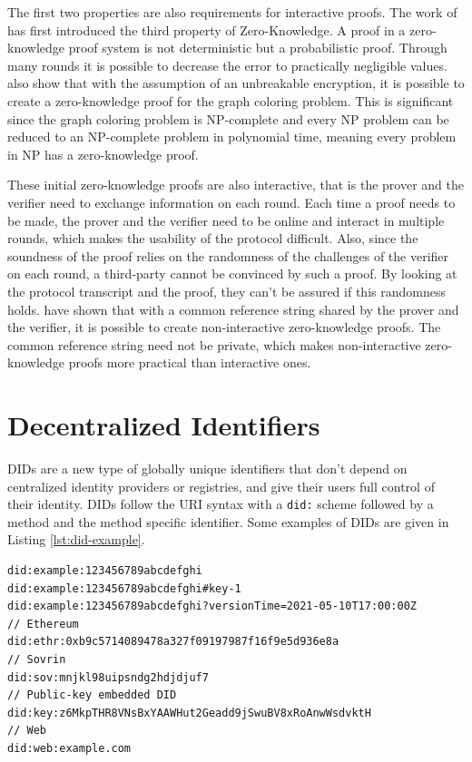 The first two properties are also requirements for interactive proofs. The work of \cite{Goldwasser.1985} has first introduced the third property of Zero-Knowledge. A proof in a zero-knowledge proof system is not deterministic but a probabilistic proof. Through many rounds it is possible to decrease the error to practically negligible values. \cite{Goldreich.1991} also show that with the assumption of an unbreakable encryption, it is possible to create a zero-knowledge proof for the graph coloring problem. This is significant since the graph coloring problem is NP-complete and every NP problem can be reduced to an NP-complete problem in polynomial time, meaning every problem in NP has a zero-knowledge proof. 

These initial zero-knowledge proofs are also interactive, that is the prover and the verifier need to exchange information on each round. Each time a proof needs to be made, the prover and the verifier need to be online and interact in multiple rounds, which makes the usability of the protocol difficult. Also, since the soundness of the proof relies on the randomness of the challenges of the verifier on each round, a third-party cannot be convinced by such a proof. By looking at the protocol transcript and the proof, they can't be assured if this randomness holds. \cite{Blum.1988} have shown that with a common reference string shared by the prover and the verifier, it is possible to create non-interactive zero-knowledge proofs. The common reference string need not be private, which makes non-interactive zero-knowledge proofs more practical than interactive ones.


\section{Decentralized Identifiers}

\acrfull{DID}s \parencite{reed_sporny_longley_allen_grant_sabadello_2021} are a new type of globally unique identifiers that don't depend on centralized identity providers or registries, and give their users full control of their identity. \acrshort{DID}s follow the \acrshort{URI} syntax with a \lstinline{did:} scheme followed by a method and the method specific identifier. Some examples of \acrshort{DID}s are given in Listing \ref{lst:did-example}.

\begin{lstlisting}[label={lst:did-example}, caption={\acrlong{DID} examples}]
did:example:123456789abcdefghi
did:example:123456789abcdefghi#key-1
did:example:123456789abcdefghi?versionTime=2021-05-10T17:00:00Z
// Ethereum 
did:ethr:0xb9c5714089478a327f09197987f16f9e5d936e8a
// Sovrin
did:sov:mnjkl98uipsndg2hdjdjuf7
// Public-key embedded DID
did:key:z6MkpTHR8VNsBxYAAWHut2Geadd9jSwuBV8xRoAnwWsdvktH
// Web
did:web:example.com
\end{lstlisting}

